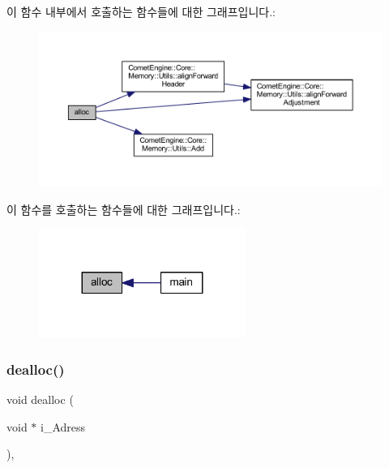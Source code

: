 이 함수 내부에서 호출하는 함수들에 대한 그래프입니다.\+:\nopagebreak
\begin{figure}[H]
\begin{center}
\leavevmode
\includegraphics[width=350pt]{class_comet_engine_1_1_core_1_1_memory_1_1_free_list_allocator_a73ff0a374ba86a2c447aaf05ad04e932_cgraph}
\end{center}
\end{figure}
이 함수를 호출하는 함수들에 대한 그래프입니다.\+:\nopagebreak
\begin{figure}[H]
\begin{center}
\leavevmode
\includegraphics[width=191pt]{class_comet_engine_1_1_core_1_1_memory_1_1_free_list_allocator_a73ff0a374ba86a2c447aaf05ad04e932_icgraph}
\end{center}
\end{figure}
\mbox{\label{class_comet_engine_1_1_core_1_1_memory_1_1_free_list_allocator_ab7a97e4b1500c7ef2c2edc3bec28a84f}} 
\subsubsection{\texorpdfstring{dealloc()}{dealloc()}}
{\footnotesize\ttfamily void dealloc (\begin{DoxyParamCaption}\item[{void $\ast$}]{i\+\_\+\+Adress }\end{DoxyParamCaption})\hspace{0.3cm}{\ttfamily [override]}, {\ttfamily [virtual]}}




